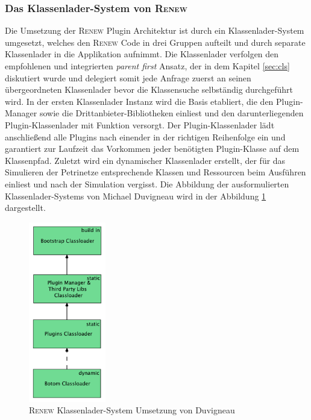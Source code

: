 		\subsubsection{Das Klassenlader-System von \textsc{Renew}}
			Die Umsetzung der \textsc{Renew} Plugin Architektur ist durch ein Klassenlader-System umgesetzt, welches den \textsc{Renew} Code in drei Gruppen aufteilt und durch separate Klassenlader in die Applikation aufnimmt. Die Klassenlader verfolgen den empfohlenen und integrierten \textit{parent first} Ansatz, der in dem Kapitel \ref{sec:cls} diskutiert wurde und delegiert somit jede Anfrage zuerst an seinen übergeordneten Klassenlader bevor die Klassensuche selbständig durchgeführt wird. \newline
			In der ersten Klassenlader Instanz wird die Basis etabliert, die den Plugin-Manager sowie die Drittanbieter-Bibliotheken einliest und den darunterliegenden Plugin-Klassenlader mit Funktion versorgt. Der Plugin-Klassenlader lädt anschließend alle Plugins nach einender in der richtigen Reihenfolge ein und garantiert zur Laufzeit das Vorkommen jeder benötigten Plugin-Klasse auf dem Klassenpfad. Zuletzt wird ein dynamischer Klassenlader erstellt, der für das Simulieren der Petrinetze entsprechende Klassen und Ressourcen beim Ausführen einliest und nach der Simulation vergisst. \newline
			Die Abbildung der ausformulierten Klassenlader-Systems von Michael Duvigneau wird in der Abbildung \ref{fig:classLoadDuv} dargestellt. \newline
			\begin{figure}[h!]
			\centering
				\includegraphics[width=0.3\textwidth]{material/images/Classloader-Hierarhie-Renew.pdf}
				\caption{\textsc{Renew} Klassenlader-System Umsetzung von Duvigneau \cite{Duvigneau09}}
				\label{fig:classLoadDuv}
			\end{figure}
